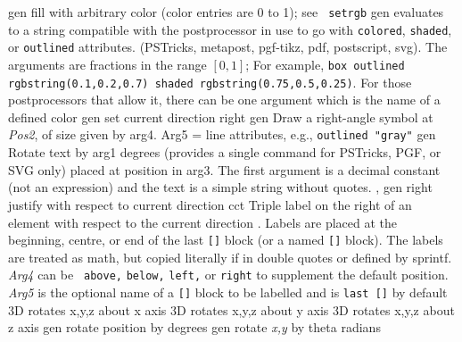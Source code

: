   {gen}
  {fill with arbitrary color (color entries are 0 to 1); see {\tt
   setrgb}}
  {gen}
  {evaluates to a string compatible with the postprocessor in use
   to go with {\tt colored}, {\tt shaded}, or {\tt outlined} attributes.
   (PSTricks, metapost, pgf-tikz, pdf, postscript, svg).  The arguments
   are fractions in the range $[0,1]$; For example, {\tt box outlined
   rgbstring(0.1,0.2,0.7) shaded rgbstring(0.75,0.5,0.25)}.  For those
   postprocessors that allow it, there can be one argument which is the
   name of a defined color}
  {gen}
  {set current direction right }
 {gen}
  {Draw a right-angle symbol at {\sl Pos2}, of size
  given by arg4. Arg5 =
   line attributes, e.g., {\tt outlined "gray"}}
  {gen}
  {Rotate text by arg1 degrees (provides a single command for
   PSTricks, PGF, or SVG only) placed at position in arg3.
   The first argument is a decimal constant (not an expression) and
   the text is a simple string without quotes.
   , }
  {gen}
  {right justify with respect to current direction}
  {cct}
  {Triple label on the right of an element with respect to the current
    direction .  Labels are placed at the beginning,
    centre, or end of the last {\tt []} block (or a named {\tt []}
    block). The labels are treated as math, but copied literally if
    in double quotes or defined by sprintf.  {\sl Arg4} can be {\tt
    above,} {\tt below,} {\tt left,} or {\tt right} to supplement the
    default position.  {\sl Arg5} is the optional name of a {\tt []}
    block to be labelled and is {\tt last []} by default}
  {3D} {rotates x,y,z about x axis}
  {3D} {rotates x,y,z about y axis}
  {3D} {rotates x,y,z about z axis}
  {gen}
  {rotate position by degrees}
  {gen}
  {rotate {\sl x,y} by theta radians}
